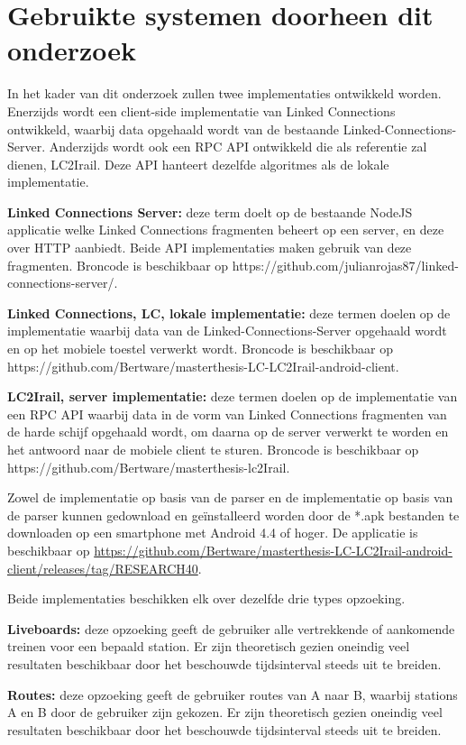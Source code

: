 \section{Gebruikte systemen doorheen dit onderzoek}
In het kader van dit onderzoek zullen twee implementaties ontwikkeld worden. Enerzijds wordt een client-side implementatie van Linked Connections ontwikkeld, waarbij data opgehaald wordt van de bestaande Linked-Connections-Server. Anderzijds wordt ook een RPC API ontwikkeld die als referentie zal dienen, LC2Irail. Deze API hanteert dezelfde algoritmes als de lokale implementatie.

\textbf{Linked Connections Server:} deze term doelt op de bestaande NodeJS applicatie welke Linked Connections fragmenten beheert op een server, en deze over HTTP aanbiedt. Beide API implementaties maken gebruik van deze fragmenten. Broncode is beschikbaar op https://github.com/julianrojas87/linked-connections-server/.

\textbf{Linked Connections, LC, lokale implementatie:} deze termen doelen op de implementatie waarbij data van de Linked-Connections-Server opgehaald wordt en op het mobiele toestel verwerkt wordt. Broncode is beschikbaar op https://github.com/Bertware/masterthesis-LC-LC2Irail-android-client.

\textbf{LC2Irail, server implementatie:} deze termen doelen op de implementatie van een RPC API waarbij data in de vorm van Linked Connections fragmenten van de harde schijf opgehaald wordt, om daarna op de server verwerkt te worden en het antwoord naar de mobiele client te sturen. Broncode is beschikbaar op https://github.com/Bertware/masterthesis-lc2Irail.

Zowel de implementatie op basis van de  parser en de implementatie op basis van de  parser kunnen gedownload en geïnstalleerd worden door de *.apk bestanden te downloaden op een smartphone met Android 4.4 of hoger. De applicatie is beschikbaar op \url{https://github.com/Bertware/masterthesis-LC-LC2Irail-android-client/releases/tag/RESEARCH40}.

Beide implementaties beschikken elk over dezelfde drie types opzoeking.

\textbf{Liveboards:} deze opzoeking geeft de gebruiker alle vertrekkende of aankomende treinen voor een bepaald station. Er zijn theoretisch gezien oneindig veel resultaten beschikbaar door het beschouwde tijdsinterval steeds uit te breiden.

\textbf{Routes:} deze opzoeking geeft de gebruiker routes van A naar B, waarbij stations A en B door de gebruiker zijn gekozen. Er zijn theoretisch gezien oneindig veel resultaten beschikbaar door het beschouwde tijdsinterval steeds uit te breiden.

